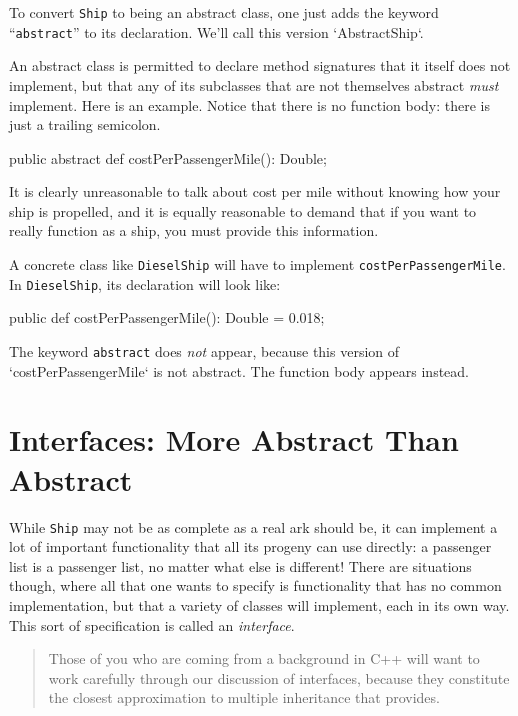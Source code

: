 To convert {\tt Ship} to being an abstract class, one just adds the keyword
``{\tt abstract}'' to its declaration.  We'll call this version
\xcd`AbstractShip`.


\begin{xtennum}[]
abstract public class AbstractShip {
    public static DEFAULT_SIZE = 500;
    public  val name: String;
    // and all the other code as from Ship.x10
\end{xtennum}


An abstract class is permitted to declare method signatures that it itself
does not 
implement, but that any of its subclasses that
are not themselves abstract {\em must} implement.  Here is an example. 
Notice that there is no function body: there is just a trailing semicolon.
\begin{xtennum}[]
  public abstract def costPerPassengerMile(): Double;
\end{xtennum}

It is clearly unreasonable to talk about cost per mile without knowing how
your ship is  propelled, and it is equally reasonable to demand that if you
want to really function as a ship, you must provide this information.


A concrete class like {\tt DieselShip}
will have to implement {\tt cost\-Per\-Passen\-ger\-Mile}.
In {\tt DieselShip}, its declaration will
look like:

\begin{xtennum}[]
  public def costPerPassengerMile(): Double = 0.018;
\end{xtennum}
The keyword {\tt abstract} does {\em not} appear, because this version of
\xcd`costPerPassengerMile` is not abstract. 
The function body appears instead.

\section{Interfaces: More Abstract Than Abstract}\label{sec:mata}

While {\tt Ship} may not be as complete as a real ark should be, it can implement a
lot of important functionality that all its progeny can use directly: a passenger list is a 
passenger list, no matter what else is different!  There are situations though, where all
that one wants to specify is functionality that has no common implementation, but
that a variety of classes will implement, each in its own way.  This sort of specification
is called an {\em interface}.  
\begin{quote}
Those of you who are coming from a background in C++ will want to work carefully through
our discussion of interfaces, because they constitute the closest approximation
to multiple inheritance that \Xten{} provides.
\end{quote}

